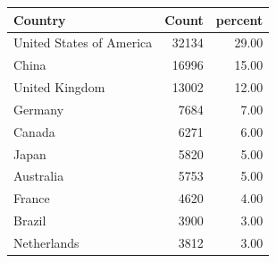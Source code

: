 \begin{table}[ht]
\centering
\begin{tabular}{lrr}
 Country & Count & percent \\ 
  \hline
United States of America & 32134 & 29.00 \\ 
  China & 16996 & 15.00 \\ 
  United Kingdom & 13002 & 12.00 \\ 
  Germany & 7684 & 7.00 \\ 
  Canada & 6271 & 6.00 \\ 
  Japan & 5820 & 5.00 \\ 
  Australia & 5753 & 5.00 \\ 
  France & 4620 & 4.00 \\ 
  Brazil & 3900 & 3.00 \\ 
  Netherlands & 3812 & 3.00 \\ 
  \end{tabular}
\end{table}
